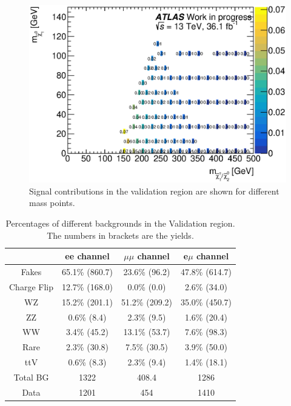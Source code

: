\begin{figure}[htbp]
\begin{center}
\includegraphics[width=\textwidth]{data/plot/Fake_VR/signal_contamination}
\caption{Signal contributions in the validation region are shown for different mass points.}
\label{fig:signal_contribution_fakes}
\end{center}
\end{figure}

\begin{table}[htbp]
\begin{center}
\begin{tabular}{|c|c|c|c|}
\hline
\hline
& ee channel & $\mu\mu$ channel & e$\mu$ channel\\
\hline
\hline
Fakes       & 65.1\% (860.7) & 23.6\% (96.2)  & 47.8\% (614.7) \\
Charge Flip & 12.7\% (168.0) &  0.0\% (0.0)   &  2.6\% (34.0)  \\
WZ          & 15.2\% (201.1) & 51.2\% (209.2) & 35.0\% (450.7) \\
ZZ          &  0.6\% (8.4)   &  2.3\% (9.5)   &  1.6\% (20.4)  \\
WW          &  3.4\% (45.2)  & 13.1\% (53.7)  &  7.6\% (98.3)  \\
Rare        &  2.3\% (30.8)  &  7.5\% (30.5)  &  3.9\% (50.0)  \\
ttV         &  0.6\% (8.3)   &  2.3\% (9.4)   &  1.4\% (18.1)  \\
\hline
Total BG    & 1322           & 408.4          & 1286 \\
\hline
Data        & 1201           & 454            & 1410 \\
\hline
\end{tabular}
\caption{Percentages of different backgrounds in the Validation region. The numbers in brackets are the yields.}
\label{tab:VRfakes_compos}
\end{center}
\end{table}

